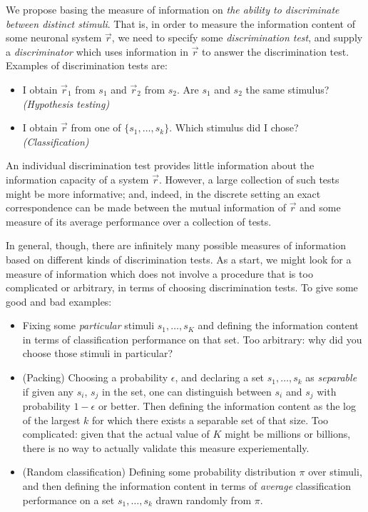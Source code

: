 \documentclass[12pt]{article}
\begin{document}
We propose basing the measure of information on \emph{the
ability to discriminate between distinct stimuli}.  That is, in order
to measure the information content of some neuronal system $\vec{r}$,
we need to specify some \emph{discrimination test}, and supply
a \emph{discriminator} which uses information in $\vec{r}$ to answer
the discrimination test.  Examples of discrimination tests are:
\begin{itemize}
\item I obtain $\vec{r}_1$ from $s_1$ and $\vec{r}_2$ from $s_2$.  Are $s_1$ and $s_2$ the same stimulus? \emph{(Hypothesis testing)}
\item I obtain $\vec{r}$ from one of $\{s_1,\hdots, s_k\}$.  Which stimulus did I chose? \emph{(Classification)}
\end{itemize}
An individual discrimination test provides little information about
the information capacity of a system $\vec{r}$. However, a large
collection of such tests might be more informative; and, indeed, in
the discrete setting an exact correspondence can be made between the
mutual information of $\vec{r}$ and some measure of its average
performance over a collection of tests.

In general, though, there are infinitely many possible measures of
information based on different kinds of discrimination tests.  As a
start, we might look for a measure of information which does not
involve a procedure that is too complicated or arbitrary, in terms of
choosing discrimination tests.  To give some good and bad examples:
\begin{itemize}
\item Fixing some \emph{particular} stimuli $s_1,\hdots ,s_K$ and defining the information content in terms of classification performance on that set.  Too arbitrary: why did you choose those stimuli in particular?
\item (Packing) Choosing a probability $\epsilon$, and declaring a set $s_1,\hdots, s_k$ as \emph{separable} if given any $s_i$, $s_j$ in the set, one can distinguish between $s_i$ and $s_j$ with probability $1-\epsilon$ or better.  Then defining the information content as the log of the largest $k$ for which there exists a separable set of that size.  Too complicated: given that the actual value of $K$ might be millions or billions, there is no way to actually validate this measure experiementally.
\item (Random classification) Defining some probability distribution $\pi$ over stimuli, and then defining the information content in terms of \emph{average} classification performance on a set $s_1,\hdots, s_k$ drawn randomly from $\pi$.  
\end{itemize}
\end{document}

